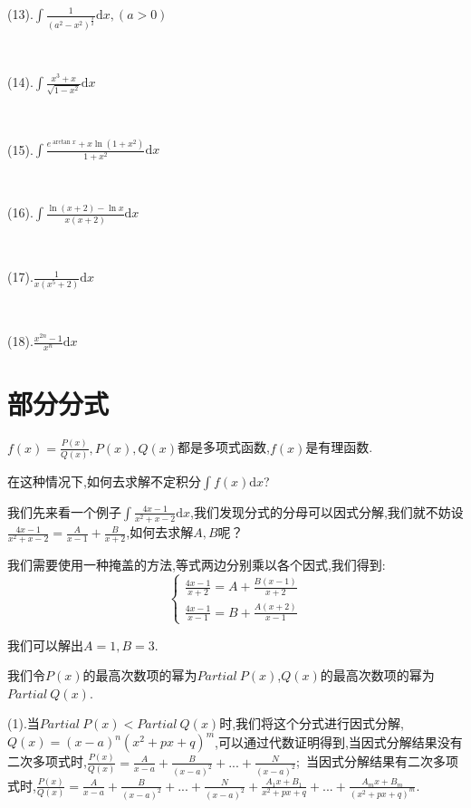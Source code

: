 \documentclass[oneside]{book}
\begin{document}
	(13).$\int \frac{1}{(a^{2}-x^{2})^{\frac{3}{2}}}\mathrm{d}x,(a>0)$
	
	\hspace{\fill}\
	
	(14).$\int \frac{x^{3}+x}{\sqrt{1-x^{2}}}\mathrm{d}x$
	
	\hspace{\fill}\
	
	(15).$\int \frac{e^{\arctan x}+x\ln(1+x^{2})}{1+x^{2}}\mathrm{d}x$
	
	\hspace{\fill}\
	
	(16).$\int\frac{\ln(x+2)-\ln x}{x(x+2)}\mathrm{d}x$
	
	\hspace{\fill}\
	
	(17).$\frac{1}{x(x^{5}+2)}\mathrm{d}x$
	
	\hspace{\fill}\
	
	(18).$\frac{x^{2n}-1}{x^{n}}\mathrm{d}x$
	
	\chapter{部分分式}
	$f(x)=\frac{P(x)}{Q(x)},P(x),Q(x)$都是多项式函数,$f(x)$是有理函数.
	
	在这种情况下,如何去求解不定积分$\int f(x)\mathrm{d}x$?
	
	我们先来看一个例子$\int \frac{4x-1}{x^{2}+x-2}\mathrm{d}x$,我们发现分式的分母可以因式分解,我们就不妨设$\frac{4x-1}{x^{2}+x-2}=\frac{A}{x-1}+\frac{B}{x+2}$,如何去求解$A,B$呢？
	
	我们需要使用一种掩盖的方法,等式两边分别乘以各个因式,我们得到:$$\left\{\begin{array}{c}
		\frac{4x-1}{x+2}=A+\frac{B(x-1)}{x+2}\\\frac{4x-1}{x-1}=B+\frac{A(x+2)}{x-1}
	\end{array}\right
	.$$
	
	我们可以解出$A=1,B=3$.
	
	我们令$P(x)$的最高次数项的幂为$Partial\ P(x)$,$Q(x)$的最高次数项的幂为$Partial\ Q(x)$.
	
	(1).当$Partial\ P(x)<Partial\ Q(x)$时,我们将这个分式进行因式分解,$Q(x)=(x-a)^{n}(x^{2}+px+q)^{m}$,可以通过代数证明得到,当因式分解结果没有二次多项式时,$\frac{P(x)}{Q(x)}=\frac{A}{x-a}+\frac{B}{(x-a)^{2}}+...+\frac{N}{(x-a)^{2}}$;\ 当因式分解结果有二次多项式时,$\frac{P(x)}{Q(x)}=\frac{A}{x-a}+\frac{B}{(x-a)^{2}}+...+\frac{N}{(x-a)^{2}}+\frac{A_{1}x+B_{1}}{x^{2}+px+q}+...+\frac{A_{m}x+B_{m}}{(x^{2}+px+q)^{m}}$.
	
\end{document}
